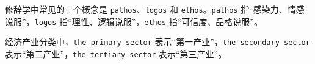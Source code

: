 \documentclass[UTF8,zihao=-4]{ctexart}
\begin{document}
修辞学中常见的三个概念是 \texttt{pathos}、\texttt{logos} 和 \texttt{ethos}。\texttt{pathos} 指“感染力、情感说服”，\texttt{logos} 指“理性、逻辑说服”，\texttt{ethos} 指“可信度、品格说服”。

经济产业分类中，\texttt{the primary sector} 表示“第一产业”，\texttt{the secondary sector} 表示“第二产业”，\texttt{the tertiary sector} 表示“第三产业”。
\end{document}
